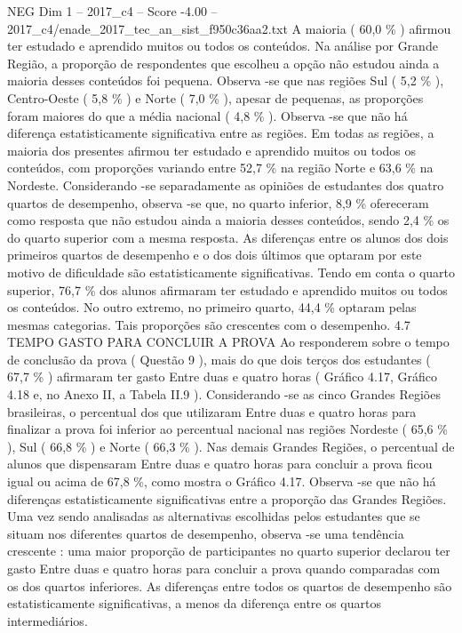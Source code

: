 \begin{textsample}{NEG Dim 1 – 2017\_c4 – Score -4.00 – 2017\_c4/enade\_2017\_tec\_an\_sist\_f950c36aa2.txt}
A maioria ( 60,0 \% ) afirmou ter estudado e aprendido muitos ou todos os conteúdos.
Na análise por Grande Região, a proporção de respondentes que escolheu a opção não estudou ainda a maioria desses conteúdos foi pequena.
Observa -se que nas regiões Sul ( 5,2 \% ), Centro-Oeste ( 5,8 \% ) e Norte ( 7,0 \% ), apesar de pequenas, as proporções foram maiores do que a média nacional ( 4,8 \% ).
Observa -se que não há diferença estatisticamente significativa entre as regiões.
Em todas as regiões, a maioria dos presentes afirmou ter estudado e aprendido muitos ou todos os conteúdos, com proporções variando entre 52,7 \% na região Norte e 63,6 \% na Nordeste.
Considerando -se separadamente as opiniões de estudantes dos quatro quartos de desempenho, observa -se que, no quarto inferior, 8,9 \% ofereceram como resposta que não estudou ainda a maioria desses conteúdos, sendo 2,4 \% os do quarto superior com a mesma resposta.
As diferenças entre os alunos dos dois primeiros quartos de desempenho e o dos dois últimos que optaram por este motivo de dificuldade são estatisticamente significativas.
Tendo em conta o quarto superior, 76,7 \% dos alunos afirmaram ter estudado e aprendido muitos ou todos os conteúdos.
No outro extremo, no primeiro quarto, 44,4 \% optaram pelas mesmas categorias.
Tais proporções são crescentes com o desempenho. 4.7 TEMPO GASTO PARA CONCLUIR A PROVA Ao responderem sobre o tempo de conclusão da prova ( Questão 9 ), mais do que dois terços dos estudantes ( 67,7 \% ) afirmaram ter gasto Entre duas e quatro horas ( Gráfico 4.17, Gráfico 4.18 e, no Anexo II, a Tabela II.9 ).
Considerando -se as cinco Grandes Regiões brasileiras, o percentual dos que utilizaram Entre duas e quatro horas para finalizar a prova foi inferior ao percentual nacional nas regiões Nordeste ( 65,6 \% ), Sul ( 66,8 \% ) e Norte ( 66,3 \% ).
Nas demais Grandes Regiões, o percentual de alunos que dispensaram Entre duas e quatro horas para concluir a prova ficou igual ou acima de 67,8 \%, como mostra o Gráfico 4.17.
Observa -se que não há diferenças estatisticamente significativas entre a proporção das Grandes Regiões.
Uma vez sendo analisadas as alternativas escolhidas pelos estudantes que se situam nos diferentes quartos de desempenho, observa -se uma tendência crescente : uma maior proporção de participantes no quarto superior declarou ter gasto Entre duas e quatro horas para concluir a prova quando comparadas com os dos quartos inferiores.
As diferenças entre todos os quartos de desempenho são estatisticamente significativas, a menos da diferença entre os quartos intermediários.

\end{textsample}

